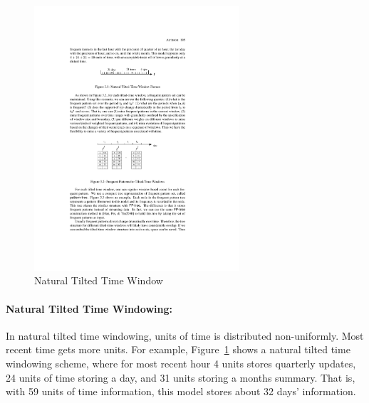 \begin{figure}[htbp]
    \begin{center}
        \includegraphics[width=3.0in]{figs/naturaltime.pdf}
        \caption{Natural Tilted Time Window}
        \label{fig:bg:ntime}
    \end{center}
\end{figure}
\paragraph{Natural Tilted Time Windowing:} In natural tilted time windowing, units of time is distributed non-uniformly. Most recent time gets more units. For example, Figure~\ref{fig:bg:ntime} shows a natural tilted time windowing scheme, where for most recent hour 4 units stores quarterly updates, 24 units of time storing a day, and 31 units storing a months summary. That is, with 59 units of time information, this model stores about 32 days' information.

